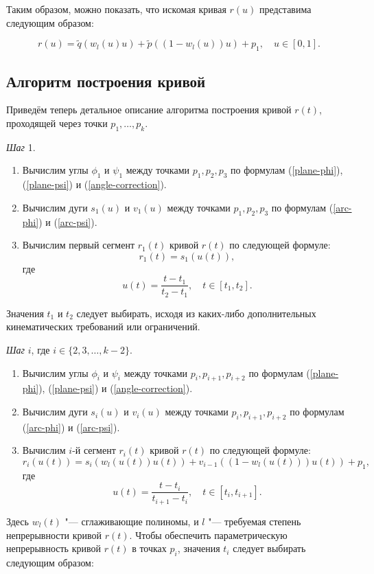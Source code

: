Таким образом, можно показать, что искомая кривая $r(u)$ представима следующим образом:

\begin{equation}
r(u)=\tilde q(w_l(u)u)+\tilde p((1-w_l(u))u)+p_1, \quad u \in [0,1].
\label{plane-deformed-curve}
\end{equation}

\subsection*{Алгоритм построения кривой}

Приведём теперь детальное описание алгоритма построения кривой $r(t)$, проходящей через точки $p_1,\dots,p_k$.

\bigskip
\textit{Шаг} 1.

\begin{enumerate}
\item Вычислим углы $\phi_1$ и $\psi_1$ между точками $p_1,p_2,p_3$ по формулам (\ref{plane-phi}), (\ref{plane-psi}) и
(\ref{angle-correction}).
\item Вычислим дуги $s_1(u)$ и $v_1(u)$ между точками $p_1,p_2,p_3$ по формулам (\ref{arc-phi}) и (\ref{arc-psi}).
\item Вычислим первый сегмент $r_1(t)$ кривой $r(t)$ по следующей формуле:
$$
r_1(t)=s_1(u(t)),
$$
\noindent где
$$
u(t)=\frac{t-t_1}{t_2-t_1}, \quad t \in [t_1,t_2].
$$
\end{enumerate}

Значения $t_1$ и $t_2$ следует выбирать, исходя из каких-либо дополнительных кинематических требований или ограничений.

\bigskip
\textit{Шаг} $i$, где $i \in \{2,3,\dots,k-2\}$.

\begin{enumerate}
\item Вычислим углы $\phi_i$ и $\psi_i$ между точками $p_i,p_{i+1},p_{i+2}$ по формулам (\ref{plane-phi}),
(\ref{plane-psi}) и (\ref{angle-correction}).
\item Вычислим дуги $s_i(u)$ и $v_i(u)$ между точками $p_i,p_{i+1},p_{i+2}$ по формулам (\ref{arc-phi}) и
(\ref{arc-psi}).
\item Вычислим $i$-й сегмент $r_i(t)$ кривой $r(t)$ по следующей формуле:
$$
r_i(u(t))=s_i(w_l(u(t))u(t))+v_{i-1}((1-w_l(u(t)))u(t))+p_1,
$$
\noindent где
$$
u(t)=\frac{t-t_i}{t_{i+1}-t_i}, \quad t \in [t_i,t_{i+1}].
$$
\end{enumerate}

Здесь $w_l(t)$ "--- сглаживающие полиномы, и $l$ "--- требуемая степень непрерывности кривой $r(t)$. Чтобы обеспечить
параметрическую непрерывность кривой $r(t)$ в точках $p_i$, значения $t_i$ следует выбирать следующим образом:


